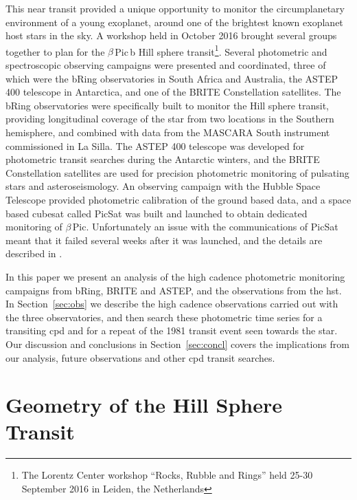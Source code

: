 \documentclass[longauth]{aa} %
\newcommand{\bpb}{$\beta$\,Pic\,b}
\newcommand{\bp}{$\beta$\,Pic}
\begin{document}
This near transit provided a unique opportunity to monitor the circumplanetary environment of a young exoplanet, around one of the brightest known exoplanet host stars in the sky.
%
A workshop held in October 2016 brought several groups together to plan for the \bpb{} Hill sphere transit\footnote{The Lorentz Center workshop ``Rocks, Rubble and Rings'' held 25-30 September 2016 in Leiden, the Netherlands}.
%
Several photometric and spectroscopic observing campaigns were presented and coordinated, three of which were the bRing observatories in South Africa and Australia, the ASTEP 400 telescope in Antarctica, and one of the BRITE Constellation satellites.
%
The bRing observatories were specifically built to monitor the Hill sphere transit, providing longitudinal coverage of the star from two locations in the Southern hemisphere, and combined with data from the MASCARA South instrument commissioned in La Silla.
%
The ASTEP 400 telescope was developed for photometric transit searches during the Antarctic winters, and the BRITE Constellation satellites are used for precision photometric monitoring of pulsating stars and asteroseismology.
%
An observing campaign with the Hubble Space Telescope provided photometric calibration of the ground based data, and a space based cubesat called PicSat \citep{Nowak18} was built and launched to obtain dedicated monitoring of \bp.
%
Unfortunately an issue with the communications of PicSat meant that it failed several weeks after it was launched, and the details are described in \citet{Nowak18}.

In this paper we present an analysis of the high cadence photometric monitoring campaigns from bRing, BRITE and ASTEP, and the observations from the \ac{hst}.
%
In Section~\ref{sec:obs} we describe the high cadence observations carried out with the three observatories, and then search these photometric time series for a transiting \ac{cpd} and for a repeat of the 1981 transit event seen towards the star.
%
Our discussion and conclusions in Section~\ref{sec:concl} covers the implications from our analysis, future observations and other \ac{cpd} transit searches.




\section{Geometry of the Hill Sphere Transit}\label{sec:hs}
\end{document}
